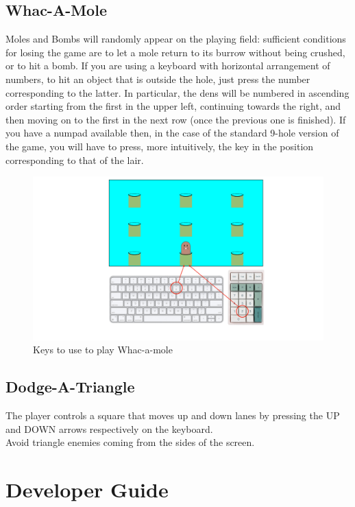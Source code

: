 \documentclass[a4paper,12pt]{report}
\begin{document}
\section*{Whac-A-Mole}
Moles and Bombs will randomly appear on the playing field: sufficient conditions for losing the game are to let a mole return to its
burrow without being crushed, or to hit a bomb. If you are using a keyboard with horizontal arrangement of numbers, to hit an object that
is outside the hole, just press the number corresponding to the latter. In particular, the dens will be numbered in ascending order starting
from the first in the upper left, continuing towards the right, and then moving on to the first in the next row (once the previous one is
finished). If you have a numpad available then, in the case of the standard 9-hole version of the game, you will have to press, more intuitively,
the key in the position corresponding to that of the lair.
\begin{figure}[ht]
	\centering{}
	\includegraphics[width=\textwidth]{res/InstructionsWam.pdf}
	\caption{Keys to use to play Whac-a-mole}
\end{figure}

\section*{Dodge-A-Triangle}
The player controls a square that moves up and down lanes by pressing the UP and DOWN arrows respectively on the keyboard.\\
Avoid triangle enemies coming from the sides of the screen.

\chapter{Developer Guide}
\end{document}
